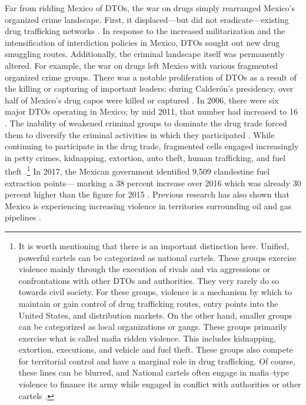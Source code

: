 \documentclass[12pt,letter,english,intoc,bibliography=totoc,index=totoc,BCOR10mm,captions=tableheading,nottitlepage,fleqn]{article}
\theoremstyle{break}
\begin{document}
Far from ridding Mexico of DTOs, the war on drugs simply rearranged Mexico's organized crime landscape. First, it displaced---but did not eradicate---existing drug trafficking networks \citep{dell2015}. In response to the increased militarization and the intensification of interdiction policies in Mexico, DTOs sought out new drug smuggling routes. Additionally, the criminal landscape itself was permanently altered. For example, the war on drugs left Mexico with various fragmented organized crime groups. There was a notable proliferation of DTOs as a result of the killing or capturing of important leaders: during Calder\'{o}n's presidency, over half of Mexico's drug capos were killed or captured \citep{Calderon2013}. In 2006, there were six major DTOs operating in Mexico; by mid 2011, that number had increased to 16 \citep{guerrero2011}. The inability of weakened criminal groups to dominate the drug trade forced them to diversify the criminal activities in which they participated \citep{rios2018}. While continuing to participate in the drug trade, fragmented cells engaged increasingly in petty crimes, kidnapping, extortion, auto theft, human trafficking, and fuel theft \citep{rios2018, jones2013youth}.\footnote{It is worth mentioning that there is an important distinction here. Unified, powerful cartels can be categorized as national cartels. These groups exercise violence mainly through the execution of rivals and via aggressions or confrontations with other DTOs and authorities. They very rarely do so towards civil society. For these groups, violence is a mechanism by which to maintain or gain control of drug trafficking routes, entry points into the United States, and distribution markets. On the other hand, smaller groups can be categorized as local organizations or gangs. These groups primarily exercise what is called mafia ridden violence. This includes kidnapping, extortion, executions, and vehicle and fuel theft. These groups also compete for territorial control and have a marginal role in drug trafficking. Of course, these lines can be blurred, and National cartels often engage in mafia--type violence to finance its army while engaged in conflict with authorities or other cartels \citep{guerrero2011}.} In 2017, the Mexican government identified 9,509 clandestine fuel extraction points--- marking a 38 percent increase over 2016 which was already 30 percent higher than the figure for 2015 \citep{rios2018}. Previous research has also shown that Mexico is experiencing increasing violence in territories surrounding oil and gas pipelines \citep{rios2018, francovivanco2023}. 
\end{document}
